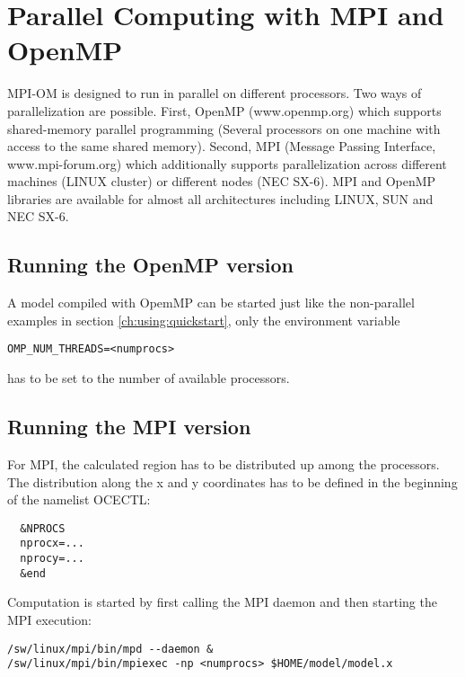 \section{Parallel Computing with MPI and OpenMP}
\label{ch:using:parallel}

MPI-OM is designed to run in parallel on different processors. Two ways of parallelization are possible.
First, OpenMP (www.openmp.org) which supports shared-memory parallel programming 
(Several processors on one machine with access to the same shared memory).
Second, MPI (Message Passing Interface, www.mpi-forum.org) which 
additionally supports parallelization across different machines (LINUX cluster) or different nodes (NEC SX-6).
MPI and OpenMP libraries are available for almost all architectures including LINUX, SUN and NEC SX-6.

\subsection{Running the OpenMP version}

A model compiled with OpemMP can be started just like the non-parallel examples in section \ref{ch:using:quickstart},
only the environment variable
\begin{footnotesize}
\begin{verbatim}
OMP_NUM_THREADS=<numprocs>
\end{verbatim}
\end{footnotesize}
has to be set to the number of available processors.

\subsection{Running the MPI version}

For MPI, the calculated region has to be distributed up among the processors.
The distribution along the x and y coordinates has to be defined in the 
beginning of the namelist OCECTL:

\begin{footnotesize}
\begin{verbatim}
  &NPROCS
  nprocx=...
  nprocy=...
  &end
\end{verbatim}
\end{footnotesize}

Computation is started by first calling the 
MPI daemon and then starting the MPI execution:

\begin{footnotesize}
\begin{verbatim}
/sw/linux/mpi/bin/mpd --daemon &
/sw/linux/mpi/bin/mpiexec -np <numprocs> $HOME/model/model.x
\end{verbatim}
\end{footnotesize}

